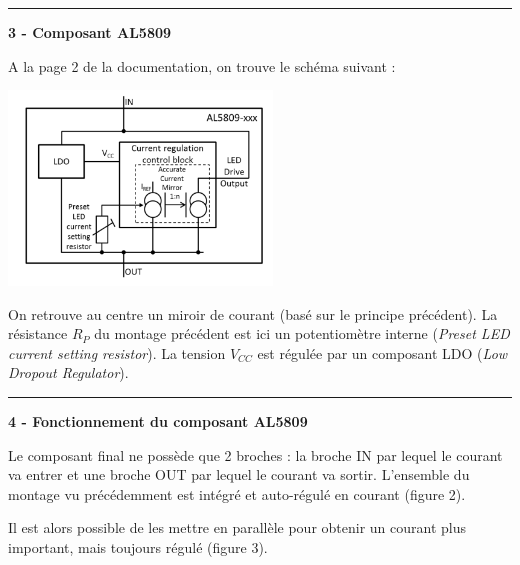 \documentclass[a4paper,french]{paper}
\begin{document}
\rule{\linewidth}{.5pt}

\textbf{3 - Composant AL5809}

A la page 2 de la documentation, on trouve le schéma suivant : 

\begin{center}
	\includegraphics[width=7cm]{images/AL5809_mirroir_courant_p2.png}
\end{center}

On retrouve au centre un miroir de courant (basé sur le principe précédent). La résistance $R_P$ du montage précédent est ici un potentiomètre interne (\textit{Preset LED current setting resistor}). La tension $V_{CC}$ est régulée par un composant LDO (\textit{Low Dropout Regulator}).

\rule{\linewidth}{.5pt}

\textbf{4 - Fonctionnement du composant AL5809}

Le composant final ne possède que 2 broches : la broche IN par lequel le courant va entrer et une broche OUT par lequel le courant va sortir. L'ensemble du montage vu précédemment est intégré et auto-régulé en courant (figure 2).

Il est alors possible de les mettre en parallèle pour obtenir un courant plus important, mais toujours régulé (figure 3).
\end{document}
